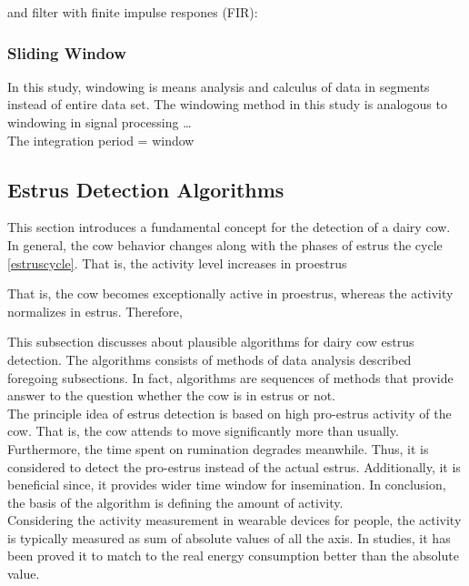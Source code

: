 \documentclass[english,12pt,a4paper,pdftex,elec,utf8]{aaltothesis}
\begin{document}
and filter with finite impulse respones (FIR):






\subsubsection{Sliding Window} \label{slidingwindowsection}

In this study, windowing is means analysis and calculus of data in segments instead of entire data set. The windowing method in this study is analogous to windowing in signal processing \cite{tan2007digital,miao2007signal} \dots \\

The integration period = window

\subsection{Estrus Detection Algorithms} \label{estrusdetectionalgorithmssection}

This section introduces a fundamental concept for the detection of  a dairy cow. In general, the cow behavior changes along with the phases of estrus the cycle \ref{estruscycle}. That is, the activity level increases in proestrus 

That is, the cow becomes exceptionally active in proestrus, whereas the activity normalizes in estrus. Therefore, 

This subsection discusses about plausible algorithms for dairy cow estrus detection. The algorithms consists of methods of data analysis described foregoing subsections. In fact, algorithms are sequences of methods that provide answer to the question whether the cow is in estrus or not. \\

The principle idea of estrus detection is based on high pro-estrus activity of the cow. That is, the cow attends to move significantly more than usually. Furthermore, the time spent on rumination degrades meanwhile. Thus, it is considered to detect the pro-estrus instead of the actual estrus. Additionally, it is beneficial since, it provides wider time window for insemination. In conclusion, the basis of the algorithm is defining the amount of activity. \\

Considering the activity measurement in wearable devices for people, the activity is typically measured as sum of absolute values of all the axis. In studies, it has been proved it to match to the real energy consumption better than the absolute value. \\
\end{document}
